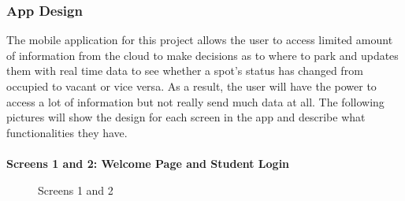 \documentclass[paper=a4, fontsize=12pt]{scrartcl}
\numberwithin{equation}{section}		%
\numberwithin{figure}{section}			%
\numberwithin{table}{section}				%
\begin{document}
\subsubsection{App Design}
The mobile application for this project allows the user to access limited amount of information from the cloud to make decisions as to where to park and updates them with real time data to see whether a spot's status has changed from occupied to vacant or vice versa. As a result, the user will have the power to access a lot of information but not really send much data at all. The following pictures will show the design for each screen in the app and describe what functionalities they have.
\\\\
\textbf{Screens 1 and 2: Welcome Page and Student Login}
\begin{figure}[H]
    \centering
    \qquad
    \caption{Screens 1 and 2}
\end{figure}
\\\\
\end{document}
